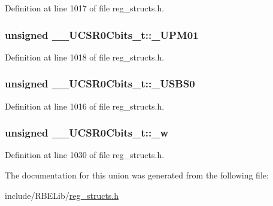 Definition at line 1017 of file reg\+\_\+structs.\+h.

\hypertarget{union_____u_c_s_r0_cbits__t_afd7f0eeae3b405be0a62ebd6aee335e7}{
\subsubsection[{\+\_\+\+U\+P\+M01}]{\setlength{\rightskip}{0pt plus 5cm}unsigned \+\_\+\+\_\+\+U\+C\+S\+R0\+Cbits\+\_\+t\+::\+\_\+\+U\+P\+M01}}\label{union_____u_c_s_r0_cbits__t_afd7f0eeae3b405be0a62ebd6aee335e7}


Definition at line 1018 of file reg\+\_\+structs.\+h.

\hypertarget{union_____u_c_s_r0_cbits__t_ad13f21e0424931ddba2352717f9d5b13}{
\subsubsection[{\+\_\+\+U\+S\+B\+S0}]{\setlength{\rightskip}{0pt plus 5cm}unsigned \+\_\+\+\_\+\+U\+C\+S\+R0\+Cbits\+\_\+t\+::\+\_\+\+U\+S\+B\+S0}}\label{union_____u_c_s_r0_cbits__t_ad13f21e0424931ddba2352717f9d5b13}


Definition at line 1016 of file reg\+\_\+structs.\+h.

\hypertarget{union_____u_c_s_r0_cbits__t_acdba0586a684377ddd26d4be1387a050}{
\subsubsection[{\+\_\+w}]{\setlength{\rightskip}{0pt plus 5cm}unsigned \+\_\+\+\_\+\+U\+C\+S\+R0\+Cbits\+\_\+t\+::\+\_\+w}}\label{union_____u_c_s_r0_cbits__t_acdba0586a684377ddd26d4be1387a050}


Definition at line 1030 of file reg\+\_\+structs.\+h.



The documentation for this union was generated from the following file\+:\begin{DoxyCompactItemize}
\item 
include/\+R\+B\+E\+Lib/\hyperlink{reg__structs_8h}{reg\+\_\+structs.\+h}\end{DoxyCompactItemize}
